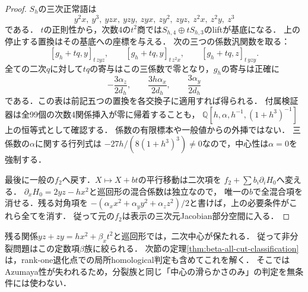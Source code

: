 \begin{proof}
$S_h$の三次正常語は
\[
 y^2x,\ y^3,\ yzx,\ yzy,\ zyx,\ zy^2,\ zyz,\ z^2x,\ z^2y,\ z^3
\]
である\cite[Lemma 3.7 and proof]{ISClifford}．
$t$の正則性から，次数4の$t^2$商では$S_{h,4}\oplus t S_{h,3}$のliftが基底になる．
上の停止する置換はその基底への座標を与える．
次の三つの係数汎関数を取る：
\[
 [g_h+tq,y]_{t\,zyz},\qquad
 [g_h+tq,y]_{t\,z^2x},\qquad
 [g_h+tq,z]_{t\,yzy}.
\]
全ての二次$q$に対して$tq$の寄与はこの三係数で零となり，$g_h$の寄与は正確に
\[
 -\frac{3\alpha_z}{2d_h},\qquad
 \frac{3h\alpha_x}{2d_h},\qquad
 \frac{3\alpha_y}{2d_h}
\]
である．この表は前記五つの置換を各交換子に適用すれば得られる．
付属検証器は全99個の次数4関係挿入が零に帰着することも，
$\mathbb Q[h,\alpha,h^{-1},(1+h^3)^{-1}]$上の恒等式として確認する．
係数の有限標本や一般値からの外挿ではない．
三係数の$\alpha$に関する行列式は
$-27h/(8(1+h^3)^3)\ne0$なので，中心性は$\alpha=0$を強制する．

最後に一般の$f_2$へ戻す．$X\mapsto X+b t$の平行移動は二次項を
$f_2+\sum b_i\partial_iH_0$へ変える．
$\partial_xH_0=2yz-hx^2$と巡回形の混合係数は独立なので，
唯一の$b$で全混合項を消せる．残る対角項を
$-(\alpha_x x^2+\alpha_y y^2+\alpha_z z^2)/2$と書けば，上の必要条件がこれら全てを消す．
従って元の$f_2$は表示の三次元Jacobian部分空間に入る．
\end{proof}

残る関係$yz+zy=h x^2+\beta_x t^2$と巡回形では，二次中心が保たれる．
従って非分裂問題はこの定数項$\beta$族に絞られる．
次節の定理\ref{thm:beta-all-cut-classification}は，rank-one退化点での局所homological判定も含めてこれを解く．
そこではAzumaya性が失われるため，分裂族と同じ「中心の滑らかさのみ」の判定を無条件には使わない．

